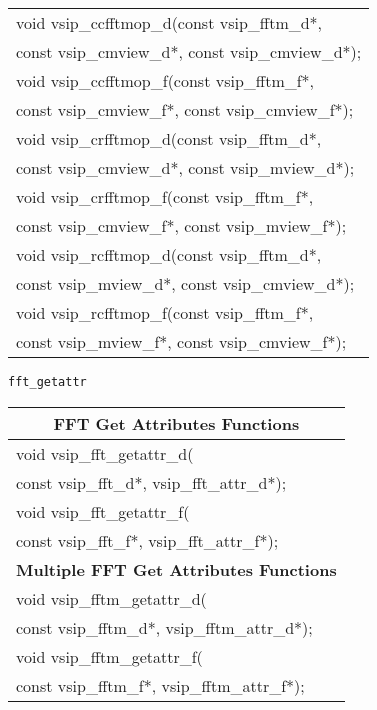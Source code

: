 {\begin{tabular}[H]{l}
void vsip\_ccfftmop\_d(const vsip\_fftm\_d*,\\*\hspace{.7cm} const vsip\_cmview\_d*, const vsip\_cmview\_d*);\\
void vsip\_ccfftmop\_f(const vsip\_fftm\_f*,\\*\hspace{.7cm} const vsip\_cmview\_f*, const vsip\_cmview\_f*);\\
void vsip\_crfftmop\_d(const vsip\_fftm\_d*,\\*\hspace{.7cm} const vsip\_cmview\_d*, const vsip\_mview\_d*);\\
void vsip\_crfftmop\_f(const vsip\_fftm\_f*,\\*\hspace{.7cm} const vsip\_cmview\_f*, const vsip\_mview\_f*);\\
void vsip\_rcfftmop\_d(const vsip\_fftm\_d*,\\*\hspace{.7cm} const vsip\_mview\_d*, const vsip\_cmview\_d*);\\
void vsip\_rcfftmop\_f(const vsip\_fftm\_f*,\\*\hspace{.7cm} const vsip\_mview\_f*, const vsip\_cmview\_f*);\\ \hline \end{tabular}
}
\clearpage
\hspace*{.8cm} \texttt{fft\_getattr}
\newline \hspace*{1.1cm} {
\ttfamily
\begin{tabular}[H]{l}\hline
\hline \multicolumn{1}{c}{\rmfamily \bfseries FFT Get Attributes Functions}\\ \hline
void vsip\_fft\_getattr\_d(\\*\hspace{.7cm}const vsip\_fft\_d*, vsip\_fft\_attr\_d*);\\
void vsip\_fft\_getattr\_f(\\*\hspace{.7cm}const vsip\_fft\_f*, vsip\_fft\_attr\_f*);\\
\hline \multicolumn{1}{c}{\rmfamily \bfseries Multiple FFT Get Attributes Functions}\\ \hline
void vsip\_fftm\_getattr\_d(\\*\hspace{.7cm}const vsip\_fftm\_d*, vsip\_fftm\_attr\_d*);\\
void vsip\_fftm\_getattr\_f(\\*\hspace{.7cm}const vsip\_fftm\_f*, vsip\_fftm\_attr\_f*);\\
\end{tabular}
}
